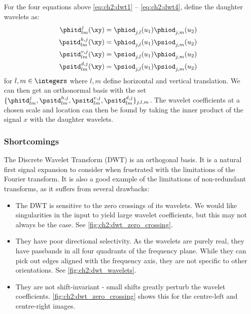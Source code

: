   For the four equations above \eqref{eq:ch2:dwt1} -- \eqref{eq:ch2:dwt4},
  define the daughter wavelets as:
  \begin{align}
    \phitd^j_{lm}(\xy) &= \phiod_{j,l}(u_1)\phiod_{j,m}(u_2) \\
    \psitd^{h,j}_{lm}(\xy) &= \phiod_{j,l}(u_1) \psiod_{j,m}(u_2) \\
    \psitd^{v,j}_{lm}(\xy) & = \psiod_{j,l}(u_1) \phiod_{j,m}(u_2) \\
    \psitd^{d,j}_{lm}(\xy) & = \psiod_{j,l}(u_1) \psiod_{j,m}(u_2)
  \end{align}
  for $l,m \in \integers$ where $l,m$ define horizontal
  and vertical translation. We can then get an orthonormal
  basis with the set $\{ \phitd^j_{lm}, \psitd^{h,j}_{lm}, \psitd^{v,j}_{lm}, \psitd^{d,j}_{lm} \}_{j,l,m}$.
  The wavelet coefficients at a chosen scale and location can then be found by
  taking the inner product of the signal $x$ with the daughter wavelets.


  \subsubsection{Shortcomings}
  The Discrete Wavelet Transform (DWT) is an orthogonal basis. It is a natural
  first signal expansion to consider when frustrated with the limitations of the
  Fourier transform. It is also a good example of the limitations of
  non-redundant transforms, as it suffers from several drawbacks:
  \begin{itemize}
    \item The DWT is sensitive to the zero crossings of its wavelets.
      We would like singularities in the input to yield large wavelet
      coefficients, but this may not always be the case.
      See \autoref{fig:ch2:dwt_zero_crossing}.
    \item They have poor directional selectivity. As the wavelets are purely
      real, they have passbands in all four quadrants of the frequency plane.
      While they can pick out edges aligned with the frequency axis, they are
      not specific to other orientations. See \autoref{fig:ch2:dwt_wavelets}.
    \item They are not shift-invariant - small shifts greatly
      perturb the wavelet coefficients. \autoref{fig:ch2:dwt_zero_crossing} shows
      this for the centre-left and centre-right images.
  \end{itemize}

